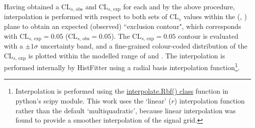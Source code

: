 Having obtained a CL\(_{s\text{, obs}}\) and CL\(_{s\text{, exp}}\) for each \ms and \mZp by the above procedure, interpolation is performed with respect to both sets of CL\(_s\) values within the (\ms, \mZp) plane to obtain an expected (observed) ``exclusion contour", which corresponds with CL\(_{s\text{, exp}}=0.05\) (CL\(_{s\text{, obs}}=0.05\)). The CL\(_{s\text{, exp}}=0.05\) contour is evaluated with a \(\pm1\sigma\) uncertainty band, and a fine-grained colour-coded distribution of the CL\(_{s\text{, exp}}\) is plotted within the modelled range of \ms and \mZp. The interpolation is performed internally by HistFitter using a radial basis interpolation function\footnote{Interpolation is performed using the \href{https://docs.scipy.org/doc/scipy/reference/generated/scipy.interpolate.Rbf.html}{interpolate.Rbf() class} function in python's scipy module. This work uses the `linear' (\(r\)) interpolation function rather than the default `multiquadratic', because linear interpolation was found to provide a smoother interpolation of the signal grid.}. 


